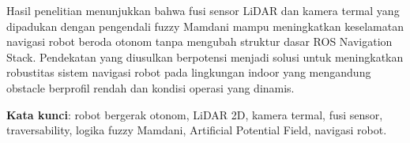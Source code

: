 Hasil penelitian menunjukkan bahwa fusi sensor LiDAR dan kamera termal yang dipadukan dengan pengendali fuzzy Mamdani mampu meningkatkan keselamatan navigasi robot beroda otonom tanpa mengubah struktur dasar ROS Navigation Stack. Pendekatan yang diusulkan berpotensi menjadi solusi untuk meningkatkan robustitas sistem navigasi robot pada lingkungan indoor yang mengandung obstacle berprofil rendah dan kondisi operasi yang dinamis.

\textbf{Kata kunci}: robot bergerak otonom, LiDAR 2D, kamera termal, fusi sensor, traversability, logika fuzzy Mamdani, Artificial Potential Field, navigasi robot.
